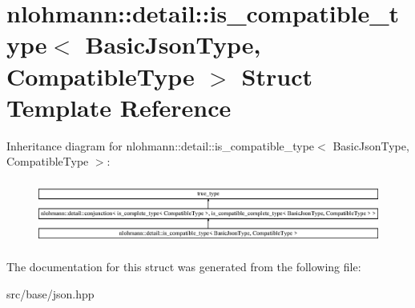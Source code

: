 \hypertarget{structnlohmann_1_1detail_1_1is__compatible__type}{}\section{nlohmann\+:\+:detail\+:\+:is\+\_\+compatible\+\_\+type$<$ Basic\+Json\+Type, Compatible\+Type $>$ Struct Template Reference}
\label{structnlohmann_1_1detail_1_1is__compatible__type}
Inheritance diagram for nlohmann\+:\+:detail\+:\+:is\+\_\+compatible\+\_\+type$<$ Basic\+Json\+Type, Compatible\+Type $>$\+:\begin{figure}[H]
\begin{center}
\leavevmode
\includegraphics[height=2.105263cm]{structnlohmann_1_1detail_1_1is__compatible__type}
\end{center}
\end{figure}


The documentation for this struct was generated from the following file\+:\begin{DoxyCompactItemize}
\item 
src/base/json.\+hpp\end{DoxyCompactItemize}
